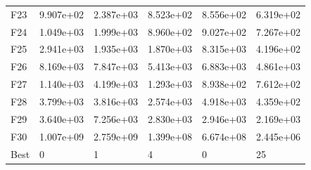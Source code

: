 \begin{tabular}{llllll}
F23  &  9.907e+02 &  2.387e+03 &  8.523e+02 &  8.556e+02 &  6.319e+02 \\
F24  &  1.049e+03 &  1.999e+03 &  8.960e+02 &  9.027e+02 &  7.267e+02 \\
F25  &  2.941e+03 &  1.935e+03 &  1.870e+03 &  8.315e+03 &  4.196e+02 \\
F26  &  8.169e+03 &  7.847e+03 &  5.413e+03 &  6.883e+03 &  4.861e+03 \\
F27  &  1.140e+03 &  4.199e+03 &  1.293e+03 &  8.938e+02 &  7.612e+02 \\
F28  &  3.799e+03 &  3.816e+03 &  2.574e+03 &  4.918e+03 &  4.359e+02 \\
F29  &  3.640e+03 &  7.256e+03 &  2.830e+03 &  2.946e+03 &  2.169e+03 \\
F30  &  1.007e+09 &  2.759e+09 &  1.399e+08 &  6.674e+08 &  2.445e+06 \\
Best &          0 &          1 &          4 &          0 &         25 \\
\bottomrule
\end{tabular}
